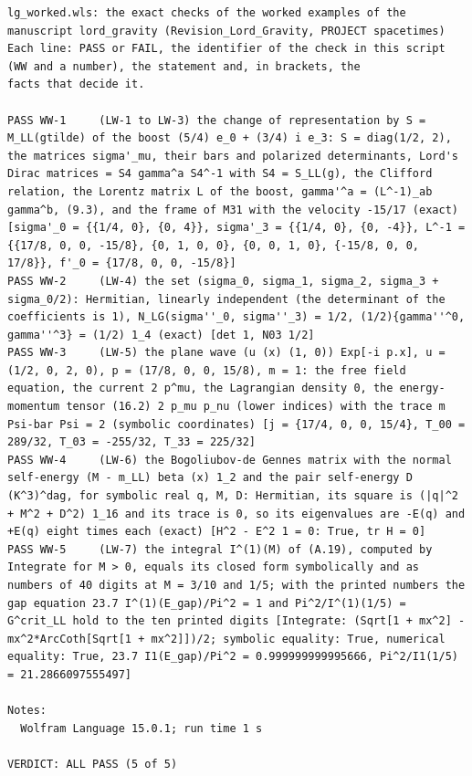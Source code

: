 \documentclass[
  10pt,
]{article}
\begin{document}
\begin{verbatim}
lg_worked.wls: the exact checks of the worked examples of the manuscript lord_gravity (Revision_Lord_Gravity, PROJECT spacetimes)
Each line: PASS or FAIL, the identifier of the check in this script (WW and a number), the statement and, in brackets, the
facts that decide it.

PASS WW-1     (LW-1 to LW-3) the change of representation by S = M_LL(gtilde) of the boost (5/4) e_0 + (3/4) i e_3: S = diag(1/2, 2), the matrices sigma'_mu, their bars and polarized determinants, Lord's Dirac matrices = S4 gamma^a S4^-1 with S4 = S_LL(g), the Clifford relation, the Lorentz matrix L of the boost, gamma'^a = (L^-1)_ab gamma^b, (9.3), and the frame of M31 with the velocity -15/17 (exact) [sigma'_0 = {{1/4, 0}, {0, 4}}, sigma'_3 = {{1/4, 0}, {0, -4}}, L^-1 = {{17/8, 0, 0, -15/8}, {0, 1, 0, 0}, {0, 0, 1, 0}, {-15/8, 0, 0, 17/8}}, f'_0 = {17/8, 0, 0, -15/8}]
PASS WW-2     (LW-4) the set (sigma_0, sigma_1, sigma_2, sigma_3 + sigma_0/2): Hermitian, linearly independent (the determinant of the coefficients is 1), N_LG(sigma''_0, sigma''_3) = 1/2, (1/2){gamma''^0, gamma''^3} = (1/2) 1_4 (exact) [det 1, N03 1/2]
PASS WW-3     (LW-5) the plane wave (u (x) (1, 0)) Exp[-i p.x], u = (1/2, 0, 2, 0), p = (17/8, 0, 0, 15/8), m = 1: the free field equation, the current 2 p^mu, the Lagrangian density 0, the energy-momentum tensor (16.2) 2 p_mu p_nu (lower indices) with the trace m Psi-bar Psi = 2 (symbolic coordinates) [j = {17/4, 0, 0, 15/4}, T_00 = 289/32, T_03 = -255/32, T_33 = 225/32]
PASS WW-4     (LW-6) the Bogoliubov-de Gennes matrix with the normal self-energy (M - m_LL) beta (x) 1_2 and the pair self-energy D (K^3)^dag, for symbolic real q, M, D: Hermitian, its square is (|q|^2 + M^2 + D^2) 1_16 and its trace is 0, so its eigenvalues are -E(q) and +E(q) eight times each (exact) [H^2 - E^2 1 = 0: True, tr H = 0]
PASS WW-5     (LW-7) the integral I^(1)(M) of (A.19), computed by Integrate for M > 0, equals its closed form symbolically and as numbers of 40 digits at M = 3/10 and 1/5; with the printed numbers the gap equation 23.7 I^(1)(E_gap)/Pi^2 = 1 and Pi^2/I^(1)(1/5) = G^crit_LL hold to the ten printed digits [Integrate: (Sqrt[1 + mx^2] - mx^2*ArcCoth[Sqrt[1 + mx^2]])/2; symbolic equality: True, numerical equality: True, 23.7 I1(E_gap)/Pi^2 = 0.999999999995666, Pi^2/I1(1/5) = 21.2866097555497]

Notes:
  Wolfram Language 15.0.1; run time 1 s

VERDICT: ALL PASS (5 of 5)
\end{verbatim}
\end{document}
